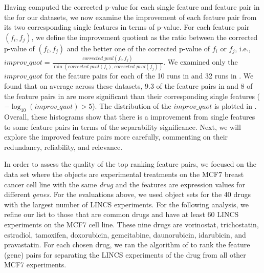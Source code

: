 
 Having computed the corrected p-value for each single feature and feature pair in the \tophundred for our datasets, we now examine the improvement of each feature pair from its two corresponding single features in terms of p-value. For each feature pair $(f_i,f_j)$, we define the improvement quotient as the ratio between the corrected p-value of $(f_i,f_j)$ and the better one of the corrected p-value of $f_i$ or $f_j$, i.e., $improv\_quot = \frac{corrected\_pval(f_i,f_j)}{\min(corrected\_pval(f_i),corrected\_pval(f_j))}$. We examined only the $improv\_quot$ for the \toptwenty feature pairs for each of the 10 runs in \msig and 32 runs in \lincs. We found that on average across these datasets, 9.3 of the \toptwenty feature pairs in \msig and 8 of the \toptwenty feature pairs in \lincs are more significant than their corresponding single features ($-\log_{10} (improv\_quot) > 5$). The distribution of the $improv\_quot$ is plotted in \histogramdiff. Overall, these histograms show that there is a improvement from single features to some feature pairs in terms of the separability significance. Next, we will explore the improved feature pairs more carefully, commenting on their redundancy, reliability, and relevance.



 In order to assess the quality of the top ranking feature pairs, we focused on the \lincs data set where the objects are experimental treatments on the MCF7 breast cancer cell line with the same {\em drug} and the features are expression values for different {\em genes}. For the evaluations above, we used object sets for the 40 drugs with the largest number of LINCS experiments. For the following analysis, we refine our list to those that are common drugs and have at least 60 LINCS experiments on the MCF7 cell line. These nine drugs are vorinostat, trichostatin, estradiol, tamoxifen, doxorubicin, gemcitabine, daunorubicin, idarubicin, and pravastatin. For each chosen drug, we ran the \sampOpt algorithm of \genviz to rank the \topthousand feature (gene) pairs for separating the LINCS experiments of the drug from all other MCF7 experiments.


